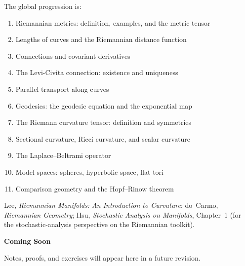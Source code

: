 The global progression is:

\begin{enumerate}
  \item Riemannian metrics: definition, examples, and the metric tensor
  \item Lengths of curves and the Riemannian distance function
  \item Connections and covariant derivatives
  \item The Levi-Civita connection: existence and uniqueness
  \item Parallel transport along curves
  \item Geodesics: the geodesic equation and the exponential map
  \item The Riemann curvature tensor: definition and symmetries
  \item Sectional curvature, Ricci curvature, and scalar curvature
  \item The Laplace--Beltrami operator
  \item Model spaces: spheres, hyperbolic space, flat tori
  \item Comparison geometry and the Hopf--Rinow theorem
\end{enumerate}

\begin{remark*}
Lee, \textit{Riemannian Manifolds: An Introduction to Curvature};
do~Carmo, \textit{Riemannian Geometry};
Hsu, \textit{Stochastic Analysis on Manifolds}, Chapter~1
(for the stochastic-analysis perspective on the Riemannian toolkit).
\end{remark*}

\vspace{1em}
\begin{tcolorbox}[
  colback=gray!6, colframe=gray!40, arc=2pt,
  left=8pt, right=8pt, top=6pt, bottom=6pt,
  title={\small\textbf{Status: Planned}},
  fonttitle=\small\bfseries
]
\begin{center}\Large\bfseries Coming Soon\end{center}
\vspace{6pt}
\noindent Notes, proofs, and exercises will appear here in a future revision.
\end{tcolorbox}

% 
% 
% 
% 
% 
% 
